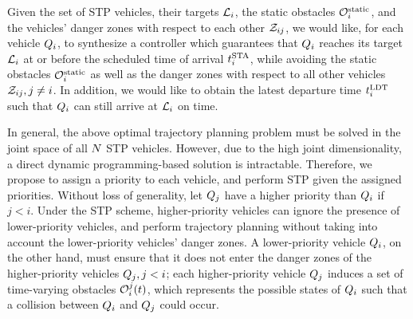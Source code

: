 Given the set of STP vehicles, their targets $\mathcal{L}_i$, the static obstacles $\mathcal{O}^\text{static}_i$, and the vehicles' danger zones with respect to each other $\mathcal{Z}_{ij}$, we would like, for each vehicle $Q_i$, to synthesize a controller which guarantees that $Q_i$ reaches its target $\mathcal{L}_i$ at or before the scheduled time of arrival $t^\text{STA}_i$, while avoiding the static obstacles $\mathcal{O}^\text{static}_i$ as well as the danger zones with respect to all other vehicles $\mathcal{Z}_{ij}, j\neq i$. In addition, we would like to obtain the latest departure time $t^\text{LDT}_i$ such that $Q_i$ can still arrive at $\mathcal{L}_i$ on time. 

In general, the above optimal trajectory planning problem must be solved in the joint space of all $N$ STP vehicles. However, due to the high joint dimensionality, a direct dynamic programming-based solution is intractable. Therefore, we propose to assign a priority to each vehicle, and perform STP given the assigned priorities. Without loss of generality, let $Q_j$ have a higher priority than $Q_i$ if $j<i$. Under the STP scheme, higher-priority vehicles can ignore the presence of lower-priority vehicles, and perform trajectory planning without taking into account the lower-priority vehicles' danger zones. A lower-priority vehicle $Q_i$, on the other hand, must ensure that it does not enter the danger zones of the higher-priority vehicles $Q_j, j<i$; each higher-priority vehicle $Q_j$ induces a set of time-varying obstacles $\mathcal{O}_i^j(t)$, which represents the possible states of $Q_i$ such that a collision between $Q_i$ and $Q_j$ could occur.

